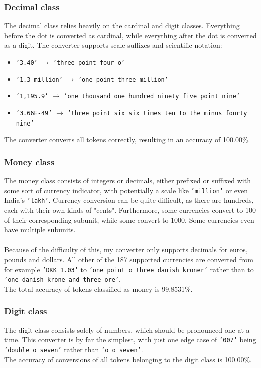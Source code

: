 \documentclass[a4paper, 9pt]{extarticle}
\newcommand{\str}[1]{\texttt{'#1'}}
\begin{document}
\subsubsection{Decimal class}
The decimal class relies heavily on the cardinal and digit classes. Everything before the dot is converted as cardinal, while everything after the dot is converted as a digit. The converter supports scale suffixes and scientific notation:
\begin{itemize}
    \itemsep-0.3em
    \item \str{3.40} $\to$ \str{three point four o}
    \item \str{1.3 million} $\to$ \str{one point three million}
    \item \str{1,195.9} $\to$ \str{one thousand one hundred ninety five point nine}
    \item \str{3.66E-49} $\to$ \str{three point six six times ten to the minus fourty nine}
\end{itemize}
The converter converts all tokens correctly, resulting in an accuracy of 100.00\%.

\subsubsection{Money class}
The money class consists of integers or decimals, either prefixed or suffixed with some sort of currency indicator, with potentially a scale like \str{million} or even India's \str{lakh}. Currency conversion can be quite difficult, as there are hundreds, each with their own kinds of "cents". Furthermore, some currencies convert to 100 of their corresponding subunit, while some convert to 1000. Some currencies even have multiple subunits.\\
\\
Because of the difficulty of this, my converter only supports decimals for euros, pounds and dollars. All other of the 187 supported currencies are converted from for example \str{DKK 1.03} to \str{one point o three danish kroner} rather than to \str{one danish krone and three ore}.\\
The total accuracy of tokens classified as money is 99.8531\%.

\subsubsection{Digit class}
The digit class consists solely of numbers, which should be pronounced one at a time. This converter is by far the simplest, with just one edge case of \str{007} being \str{double o seven} rather than \str{o o seven}.\\
The accuracy of conversions of all tokens belonging to the digit class is 100.00\%.
\end{document}
